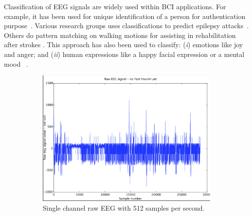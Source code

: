 \documentclass[a4paper,10pt,english,lof,lot,twoside]{puthesis}
\begin{document}
Classification of EEG signals are widely used within BCI applications. For
example, it has been used for unique identification of a person for
authentication purpose \cite{schmalstieg_gaze-directed_2010}. Various
research groups uses classifications to predict epilepsy attacks \cite{stam_nonlinear_2005}\cite{meng_feature_2010}. Others do pattern
matching on walking motions for assisting in rehabilitation after strokes
\cite{kuramoto_trigger_2012}. This approach has also been used to classify:
(\emph{i}) emotions like joy and anger; and (\emph{ii}) human expressions like a happy
facial expression or a mental mood  \cite{hutchison_emotional_2011}
\cite{bekkedal_human_2011} \cite{ichi_ito_association_2010}.

\begin{figure}
\centering
\capstart
\begin{subfigure}[t]{0.48\linewidth}
\centering
\capstart

\includegraphics[width=1.000\linewidth]{mindwave_eeg_raw.png}
\caption[Single channel raw EEG]{Single channel raw EEG with 512 samples per second.}\label{ch-background/index:fig-background-mindwave-eeg-raw}\end{subfigure}
\begin{subfigure}[t]{0.48\linewidth}
\centering
\capstart


\end{subfigure}
\end{figure}
\end{document}
